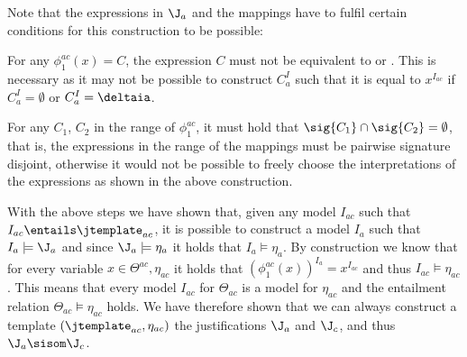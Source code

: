Note that the expressions in $\J_{a}$ and the mappings have to fulfil certain conditions for this construction to be possible:
\begin{compactenum}
\item For any  $\phi^{ac}_{1}(x) = C$, the expression $C$ must not be equivalent to \thing or \nothing. This is necessary as it may not be possible to construct $C^I_{a}$ such that it is equal to $x^{I_{ac}}$ if $C^I_{a} = \emptyset$ or $C^I_{a} = \deltaia$.
\item For any $C_{1}$, $C_{2}$ in the range of $\phi^{ac}_{1}$, it must hold that $\sig{C_{1}} \cap \sig{C_{2}} = \emptyset$, that is, the expressions in the range of the mappings must be pairwise signature disjoint, otherwise it would not be possible to freely choose the interpretations of the expressions as shown in the above construction.
\end{compactenum}

With the above steps we have shown that, given any model $I_{ac}$ such that $I_{ac} \entails \jtemplate_{ac}$, it is possible to construct a model $I_{a}$ such that $I_{a} \models \J_{a}$ and since $\J_{a} \models \eta_{a}$ it holds that $I_{a} \models \eta_{a}$. 
By construction we know that for every variable $x \in \Theta^{ac}, \eta_{ac}$ it holds that $(\phi^{ac}_{1}(x))^{I_{a}} = x^{I_{ac}}$ and thus $I_{ac} \models \eta_{ac}$. This means that every model $I_{ac}$ for $\Theta_{ac}$ is a model for $\eta_{ac}$ and the entailment relation $\Theta_{ac} \models \eta_{ac}$ holds. We have therefore shown that we can always construct a template $(\jtemplate_{ac}, \eta_{ac})$ the justifications $\J_{a}$ and $\J_{c}$, and thus $\J_{a} \sisom \J_{c}$.